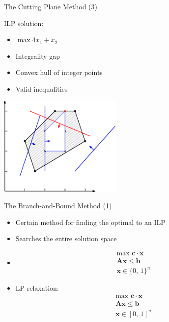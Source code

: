 \documentclass[10pt]{beamer}
\begin{document}
\begin{frame}[t]{The Cutting Plane Method (3)}
        \begin{minipage}[t]{0.48\textwidth}
            ILP solution:
            \begin{itemize}
                \item \alert{$ \max 4x_1 + x_2 $}
                \item Integrality gap
                \item Convex hull of integer points
                \item Valid inequalities
            \end{itemize}
        \end{minipage}
        \begin{minipage}[t]{0.48\textwidth}
            \begin{center}
                \includegraphics[width=6cm]{cutting_plane013.eps} 
            \end{center}
        \end{minipage}        
\end{frame}


\begin{frame}[t]{The Branch-and-Bound Method (1)}
    \begin{itemize}
        \item<1-> Certain method for finding the optimal to an ILP
        \item<2-> Searches the entire solution space
        \item<3-> [ ]
            \begin{align}
                \text {max }  \mathbf{c} \cdot \mathbf{x}   \nonumber\\
                \mathbf{A} \mathbf{x}   \leq \mathbf{b}     \nonumber\\
                \mathbf{x} \in \{ 0, \, 1 \}^{n}            \nonumber
            \end{align}
         \item<4-> LP relaxation: 
            \begin{align}
                \text {max }  \mathbf{c} \cdot \mathbf{x}   \nonumber\\
                \mathbf{A} \mathbf{x}   \leq \mathbf{b}     \nonumber\\
                \mathbf{x} \in [ 0, \, 1 ]^{n}            \nonumber
            \end{align}
    \end{itemize}
\end{frame}
\end{document}
